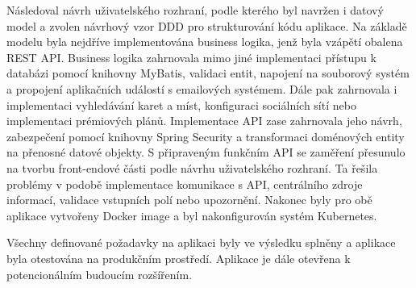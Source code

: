 Následoval návrh uživatelského rozhraní, podle kterého byl navržen i datový model a zvolen návrhový vzor \ac{DDD} pro strukturování
kódu aplikace.
Na základě modelu byla nejdříve implementována business logika, jenž byla vzápětí obalena \ac{REST} \ac{API}.
Business logika zahrnovala mimo jiné implementaci přístupu k databázi pomocí knihovny MyBatis, validaci entit, napojení
na souborový systém a propojení aplikačních událostí s emailových systémem.
Dále pak zahrnovala i implementaci vyhledávání karet a míst, konfiguraci sociálních sítí nebo implementaci prémiových plánů.
Implementace \ac{API} zase zahrnovala jeho návrh, zabezpečení pomocí knihovny Spring Security a transformaci
doménových entity na přenosné datové objekty.
S připraveným funkčním \ac{API} se zaměření přesunulo na tvorbu front-endové části podle návrhu uživatelského rozhraní.
Ta řešila problémy v podobě implementace komunikace s \ac{API}, centrálního zdroje informací,
validace vstupních polí nebo upozornění.
Nakonec byly pro obě aplikace vytvořeny Docker image a byl nakonfigurován systém Kubernetes.

Všechny definované požadavky na aplikaci byly ve výsledku splněny a aplikace byla otestována na produkčním prostředí.
Aplikace je dále otevřena k potencionálním budoucím rozšířením.

